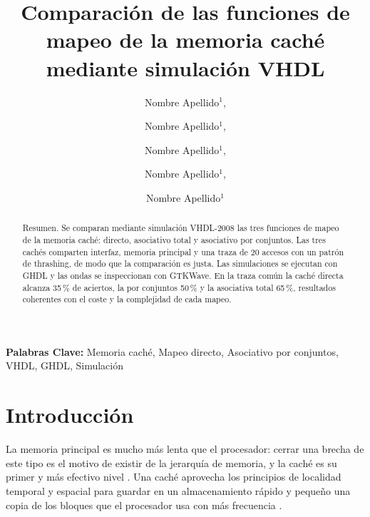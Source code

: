 \documentclass[llncs]{llncs}
\begin{document}
\title{Comparación de las funciones de mapeo de la memoria caché\\
mediante simulación VHDL}

\author{Nombre Apellido$^{1}$,%
\and Nombre Apellido$^{1}$,%
\and Nombre Apellido$^{1}$,%
\and Nombre Apellido$^{1}$,%
\and Nombre Apellido$^{1}$}


\maketitle

\begin{abstract}
Resumen. Se comparan mediante simulación VHDL-2008 las tres funciones
de mapeo de la memoria caché: directo, asociativo total y asociativo
por conjuntos. Las tres cachés comparten interfaz, memoria principal
y una traza de 20 accesos con un patrón de thrashing, de modo que la
comparación es justa. Las simulaciones se ejecutan con GHDL y las
ondas se inspeccionan con GTKWave. En la traza común la caché directa
alcanza 35\,\% de aciertos, la por conjuntos 50\,\% y la asociativa
total 65\,\%, resultados coherentes con el coste y la complejidad de
cada mapeo.
\end{abstract}

\noindent\textbf{Palabras Clave:} Memoria caché, Mapeo directo,
Asociativo por conjuntos, VHDL, GHDL, Simulación

\section{Introducción}
\label{sec:intro}

La memoria principal es mucho más lenta que el procesador: cerrar una
brecha de este tipo es el motivo de existir de la jerarquía de
memoria, y la caché es su primer y más efectivo nivel
\cite{stallings2019,hennessy2019,tanenbaum2013}. Una caché aprovecha
los principios de localidad temporal y espacial \cite{wikipedia-locality}
para guardar en un almacenamiento
rápido y pequeño una copia de los bloques que el procesador usa con
más frecuencia \cite{patterson2017,bryant2015}.
\end{document}
